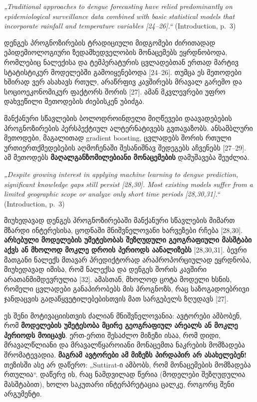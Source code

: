 \documentclass[11pt,a4paper]{article}
\newcommand{\imp}[1]{\textbf{\color{importred}#1}}
\begin{document}
\begin{citat}
\textit{„Traditional approaches to dengue forecasting have relied predominantly on epidemiological surveillance data combined with basic statistical models that incorporate rainfall and temperature variables [24--26].“} (Introduction, p.~3)
\end{citat}

დენგეს პროგნოზირების ტრადიციული მიდგომები ძირითადად ეპიდემიოლოგიური ზედამხედველობის მონაცემებს
ეყრდნობოდა, რომლებიც ნალექისა და ტემპერატურის ცვლადებთან ერთად მარტივ სტატისტიკურ მოდელებში
გამოიყენებოდა [24--26]. თუმცა ეს მეთოდები ხშირად ვერ ასახავს რთულ, არაწრფივ კავშირებს მრავალ გარემო
და სოციოეკონომიკურ ფაქტორს შორის [27]. ამან მკვლევრები უფრო დახვეწილი მეთოდების ძიებისკენ უბიძგა.

მანქანური სწავლების ბოლოდროინდელი მიღწევები დაავადებების პროგნოზირების პერსპექტიულ ალტერნატივებს
გვთავაზობს. ანსამბლური მეთოდები, მაგალითად gradient boosting, ცვლადებს შორის რთული ურთიერთქმედებების
აღმოჩენაში შესანიშნავ შედეგებს აჩვენებს [27--29]. ამ მეთოდებს \imp{მაღალგანზომილებიანი მონაცემების}
დამუშავება შეუძლია.

\begin{citat}
\textit{„Despite growing interest in applying machine learning to dengue prediction, significant knowledge gaps still persist [28,30]. Most existing models suffer from a limited geographic scope or analyze only short time periods [28,30,31].“} (Introduction, p.~3)
\end{citat}

მიუხედავად დენგეს პროგნოზირებაში მანქანური სწავლების მიმართ მზარდი ინტერესისა, ცოდნაში მნიშვნელოვანი
ხარვეზები რჩება [28,30]. \imp{არსებული მოდელების უმეტესობას შეზღუდული გეოგრაფიული მასშტაბი აქვს ან
მხოლოდ მოკლე დროის პერიოდს აანალიზებს} [28,30,31]. ბევრი მათგანი ნალექს მთავარ პრედიქტორად
არაპროპორციულად ეყრდნობა, მიუხედავად იმისა, რომ ნალექსა და დენგეს შორის კავშირი არათანმიმდევრულია [32].
ამასთან, მხოლოდ ცოტა მოდელი ხსნის, რომელი ცვლადები განაპირობებს მის პროგნოზს, რაც საზოგადოებრივი
ჯანდაცვის გადაწყვეტილებებისთვის მათ სარგებელს ზღუდავს [27].

\begin{etl}
ეს შენი მოტივაციისთვის ძალიან მნიშვნელოვანია: ავტორები ამბობენ, რომ \imp{მოდელების უმეტესობა მცირე
გეოგრაფიულ არეალს ან მოკლე პერიოდს მოიცავს}. ერთ-ერთი შესაძლო მიზეზი ისაა, რომ დიდი, მრავალწლიანი
და მრავალწყაროიანი მონაცემთა ნაკრების მომზადება შრომატევადია. \textbf{მაგრამ ავტორები ამ მიზეზს პირდაპირ არ ასახელებენ!}
თეზისში ასე არ დაწერო: „Suttirat-ი ამბობს, რომ მონაცემების მომზადება რთულია“. დაწერე ის, რაც ნამდვილად წერია
(მოდელები შეზღუდულია მასშტაბით), ხოლო საკუთარი ინტერპრეტაცია ცალკე, როგორც შენი არგუმენტი.
\end{etl}
\end{document}
